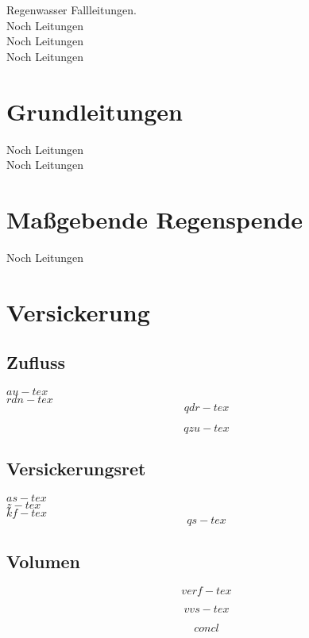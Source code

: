 \documentclass[12pt]{report}
\begin{document}
Regenwasser Fallleitungen.\\
Noch Leitungen\\
Noch Leitungen\\
Noch Leitungen\\

\section*{Grundleitungen}

Noch Leitungen\\
Noch Leitungen\\

\section*{Maßgebende Regenspende}

Noch Leitungen\\

\section*{Versickerung}

\subsection*{Zufluss}

$au-tex$ \\
$rdn-tex$ \\

\begin{equation}
        qdr-tex
\end{equation}

\begin{equation}
        qzu-tex
\end{equation}

\subsection*{Versickerungsret}

$as-tex$ \\
$z-tex$ \\
$kf-tex$ \\

\begin{equation}
        qs-tex
\end{equation}

\subsection*{Volumen}

\begin{equation}
        verf-tex
\end{equation}

\begin{equation}
        vvs-tex
\end{equation}

\begin{equation}
        concl
\end{equation}
\end{document}
